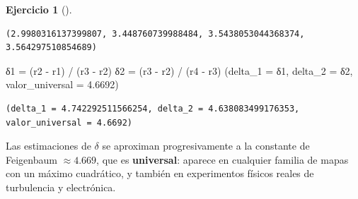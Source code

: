 \documentclass[
  spanish,
  a4paper,
]{scrreport}
\newenvironment{Shaded}{\begin{snugshade}}{\end{snugshade}}
\newcommand{\FloatTok}[1]{\textcolor[rgb]{0.68,0.00,0.00}{#1}}
\newcommand{\NormalTok}[1]{\textcolor[rgb]{0.00,0.23,0.31}{#1}}
\newcommand{\OperatorTok}[1]{\textcolor[rgb]{0.37,0.37,0.37}{#1}}
\theoremstyle{definition}
\newtheorem{exercise}{Ejercicio}[chapter]
\theoremstyle{remark}
\begin{document}
\begin{exercise}[]
\begin{tcolorbox}
\begin{verbatim}
(2.9980316137399807, 3.448760739988484, 3.5438053044368374, 3.564297510854689)
\end{verbatim}

\begin{Shaded}
\begin{Highlighting}[]
\NormalTok{δ}\FloatTok{1} \OperatorTok{=}\NormalTok{ (r2 }\OperatorTok{{-}}\NormalTok{ r1) }\OperatorTok{/}\NormalTok{ (r3 }\OperatorTok{{-}}\NormalTok{ r2)}
\NormalTok{δ}\FloatTok{2} \OperatorTok{=}\NormalTok{ (r3 }\OperatorTok{{-}}\NormalTok{ r2) }\OperatorTok{/}\NormalTok{ (r4 }\OperatorTok{{-}}\NormalTok{ r3)}
\NormalTok{(delta\_1 }\OperatorTok{=}\NormalTok{ δ}\FloatTok{1}\NormalTok{, delta\_2 }\OperatorTok{=}\NormalTok{ δ}\FloatTok{2}\NormalTok{, valor\_universal }\OperatorTok{=} \FloatTok{4.6692}\NormalTok{)}
\end{Highlighting}
\end{Shaded}

\begin{verbatim}
(delta_1 = 4.742292511566254, delta_2 = 4.638083499176353, valor_universal = 4.6692)
\end{verbatim}

Las estimaciones de \(\delta\) se aproximan progresivamente a la
constante de Feigenbaum \(\approx 4.669\), que es \textbf{universal}:
aparece en cualquier familia de mapas con un máximo cuadrático, y
también en experimentos físicos reales de turbulencia y electrónica.

\end{tcolorbox}

\end{exercise}
\end{document}
